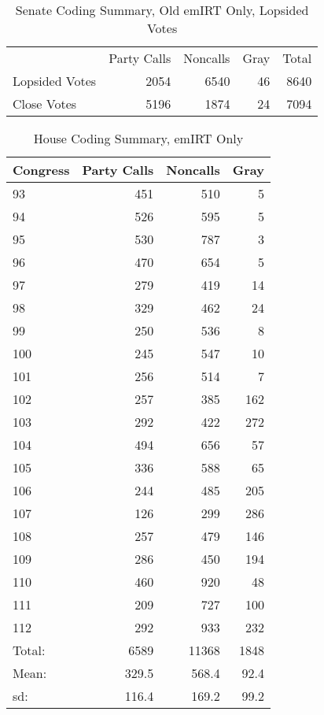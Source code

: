 \documentclass[12pt]{article}
\begin{document}
\begin{table}
	\caption{Senate Coding Summary, Old emIRT Only, Lopsided Votes}
	\centering
	\begin{tabular}{lrrrr}
		\hline
		& Party Calls & Noncalls & Gray & Total \\
		Lopsided Votes & 2054 & 6540 & 46 & 8640 \\
		Close Votes  & 5196 & 1874 & 24 & 7094 \\
		\hline
	\end{tabular}
\end{table}

\begin{table}[ht]
	\caption{House Coding Summary, emIRT Only}
	\centering
	\begin{tabular}{lrrr}
		\hline
		Congress & Party Calls & Noncalls & Gray \\ 
		\hline
		93 & 451 & 510 &   5 \\ 
		94 & 526 & 595 &   5 \\ 
		95 & 530 & 787 &   3 \\ 
		96 & 470 & 654 &   5 \\ 
		97 & 279 & 419 &  14 \\ 
		98 & 329 & 462 &  24 \\ 
		99 & 250 & 536 &   8 \\ 
		100 & 245 & 547 &  10 \\ 
		101 & 256 & 514 &   7 \\ 
		102 & 257 & 385 & 162 \\ 
		103 & 292 & 422 & 272 \\ 
		104 & 494 & 656 &  57 \\ 
		105 & 336 & 588 &  65 \\ 
		106 & 244 & 485 & 205 \\ 
		107 & 126 & 299 & 286 \\ 
		108 & 257 & 479 & 146 \\ 
		109 & 286 & 450 & 194 \\ 
		110 & 460 & 920 &  48 \\ 
		111 & 209 & 727 & 100 \\ 
		112 & 292 & 933 & 232 \\ 
		\hline
		Total: & 6589 & 11368 & 1848 \\
		Mean: & 329.5 & 568.4 & 92.4 \\
		sd: & 116.4 & 169.2 & 99.2 \\
		\hline
	\end{tabular}
\end{table}
\end{document}
